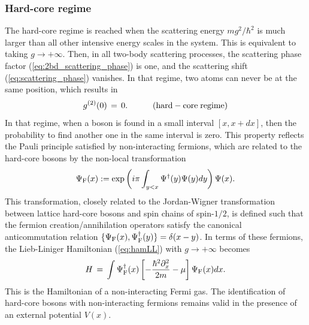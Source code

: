 \documentclass[onecolumn,amsfonts,showpacs,superscriptaddress]{revtex4-1}
\begin{document}
\subsubsection{Hard-core regime}
The hard-core regime is reached when the scattering energy $m g^2/\hbar^2$ is much larger than all other intensive energy scales in the system. This is equivalent to taking $g \rightarrow +\infty$. Then, in all two-body scattering processes, the scattering phase factor (\ref{eq:2bd_scattering_phase}) is one, and the scattering shift (\ref{eq:scattering_phase}) vanishes. In that regime, two atoms can never be at the same position, which results
in
\begin{equation}
    \label{eq:g2_hardcore}
    g^{(2)} (0) \, = \, 0. \qquad \quad ({\rm hard-core \; regime}) 
\end{equation}
In that regime, when a boson is found in a small interval $[x,x+dx]$, then the probability to find another one in the same interval is zero. This property reflects the Pauli principle satisfied by 
non-interacting fermions, which are related to the hard-core bosons by the non-local transformation
\begin{equation}
    \label{eq:Jordan_Wigner}
    \Psi_{\rm F}(x) := \exp \left( i \pi \int_{y<x} \Psi^\dagger(y) \Psi(y) dy \right) \Psi(x).
\end{equation}
This transformation, closely related to the Jordan-Wigner transformation between lattice hard-core bosons and spin chains of spin-$1/2$, is defined such that the fermion creation/annihilation operators satisfy the canonical anticommutation relation $\{ \Psi_{\rm F}(x) , \Psi_{\rm F}^\dagger (y) \} = \delta(x-y)$. In terms of these fermions, the Lieb-Liniger Hamiltonian (\ref{eq:hamLL}) with $g \rightarrow +\infty$ becomes
\begin{equation}
   H \, =\, \int \Psi_{\rm F}^\dagger(x) \left[ - \frac{\hbar^2 \partial_x^2}{2m} - \mu \right] \Psi_{\rm F}(x) dx .
\end{equation}
This is the Hamiltonian of a non-interacting Fermi gas. The identification of hard-core bosons with non-interacting fermions remains valid in the presence of an external potential $V(x)$.
\end{document}
